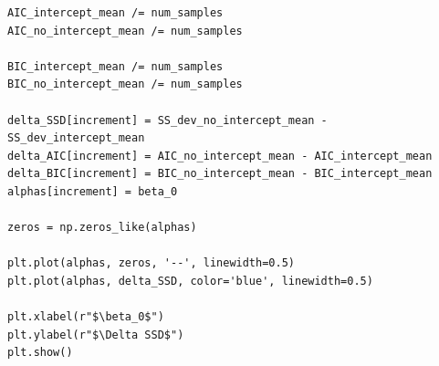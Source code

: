 \documentclass[12pt,a4paper,oneside]{book} %
\begin{document}
\begin{mdframed}[linecolor=black, topline=true, bottomline=true,
	leftline=false, rightline=false, backgroundcolor=yellow!20!white]
\begin{verbatim}
AIC_intercept_mean /= num_samples
AIC_no_intercept_mean /= num_samples

BIC_intercept_mean /= num_samples
BIC_no_intercept_mean /= num_samples

delta_SSD[increment] = SS_dev_no_intercept_mean - SS_dev_intercept_mean
delta_AIC[increment] = AIC_no_intercept_mean - AIC_intercept_mean
delta_BIC[increment] = BIC_no_intercept_mean - BIC_intercept_mean
alphas[increment] = beta_0

zeros = np.zeros_like(alphas)

plt.plot(alphas, zeros, '--', linewidth=0.5)
plt.plot(alphas, delta_SSD, color='blue', linewidth=0.5)

plt.xlabel(r"$\beta_0$")
plt.ylabel(r"$\Delta SSD$")
plt.show()


		\end{verbatim}
\end{mdframed}
	
	
	
	
\end{document}
